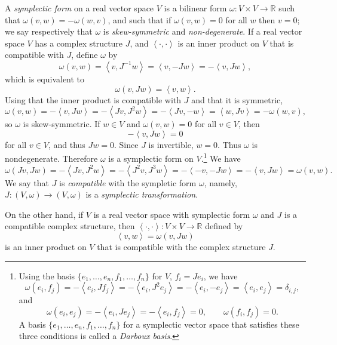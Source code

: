 \documentclass{article}
\newcommand{\inner}[2]{\left\langle #1, #2 \right\rangle}
\begin{document}
A {\em symplectic form} on a real vector space $V$ is a bilinear form $\omega:V \times V \to \mathbb{R}$
such that $\omega(v,w)=-\omega(w,v)$, and such that if $\omega(v,w)=0$ for all $w$ then
$v=0$; we say respectively that $\omega$ is {\em skew-symmetric} and {\em non-degenerate}.
If a real vector space $V$ has a complex structure $J$, and $\inner{\cdot}{\cdot}$ is an inner product on $V$ that is compatible with $J$,
 define $\omega$ by
\[
\omega(v,w)=\inner{v}{J^{-1}w}=\inner{v}{-Jw}=-\inner{v}{Jw},
\]
which is equivalent to
\[
\omega(v,Jw)=\inner{v}{w}.
\]
Using that the inner product is compatible with $J$ and that it is symmetric,
\[
\omega(v,w)=-\inner{v}{Jw}=-\inner{Jv}{J^2 w}=-\inner{Jv}{-w}=\inner{w}{Jv}=-\omega(w,v),
\]
so $\omega$ is skew-symmetric. If $w \in V$ and $\omega(v,w)=0$ for all $v \in V$, then
\[
-\inner{v}{Jw}=0
\]
for all $v \in V$, and thus $Jw=0$. Since $J$ is invertible, $w=0$. Thus $\omega$ is nondegenerate. Therefore
$\omega$ is a symplectic form on $V$.\footnote{Using the basis
$\{e_1,\ldots,e_n,f_1,\ldots,f_n\}$ for $V$, $f_i=Je_i$, we have 
\[
\omega(e_i,f_j)=-\inner{e_i}{Jf_j}=-\inner{e_i}{J^2e_j}=-\inner{e_i}{-e_j}=\inner{e_i}{e_j}=\delta_{i,j},
\]
and
\[
\omega(e_i,e_j)=-\inner{e_i}{Je_j}=-\inner{e_i}{f_j}=0, \qquad \omega(f_i,f_j)=0.
\]
A basis $\{e_1,\ldots,e_n,f_1,\ldots,f_n\}$ for a symplectic vector space that satisfies these three conditions
is called a {\em Darboux basis}.}
We have
\[
\omega(Jv,Jw)=-\inner{Jv}{J^2w}=-\inner{J^2v}{J^3w}=-\inner{-v}{-Jw}=-\inner{v}{Jw}=\omega(v,w).
\]
We say that $J$ is {\em compatible} with the sympletic form $\omega$, namely, $J:(V,\omega) \to (V,\omega)$ is
a {\em symplectic transformation}.

On the other hand,
if $V$ is a real vector space with symplectic form $\omega$ and $J$ is a compatible complex structure,
then $\inner{\cdot}{\cdot}: V \times V \to \mathbb{R}$ defined by
\[
\inner{v}{w}=\omega(v,Jw)
\]
is an inner product on $V$ that is compatible with the complex structure $J$. 
\end{document}
